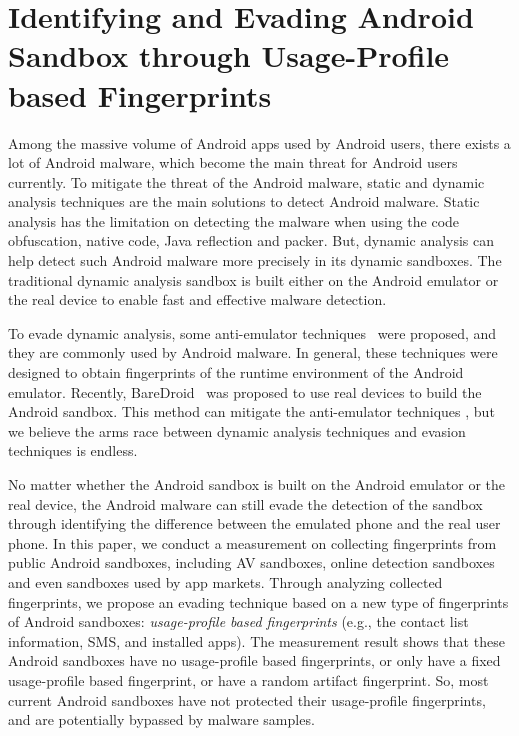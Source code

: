 \chapter{Identifying and Evading Android Sandbox through Usage-Profile based Fingerprints}


Among the massive volume of Android apps used by Android users, there exists a lot of Android malware, which become the main threat for Android users currently. To mitigate the threat of the Android malware, static and dynamic analysis techniques are the main solutions to detect Android malware. Static analysis has the limitation on detecting the malware when using the code obfuscation, native code, Java reflection and packer. But, dynamic analysis can help detect such Android malware more precisely in its dynamic sandboxes. The traditional dynamic analysis sandbox is built either on the Android emulator or the real device to enable fast and effective malware detection. 

To evade dynamic analysis, some anti-emulator techniques~\cite{Petsas,Vidas,Jing} were proposed, and they are commonly used by Android malware. In general, these techniques were designed to obtain fingerprints of the runtime environment of the Android emulator. Recently, BareDroid~\cite{Mutti:2015:BLA:2818000.2818036} was proposed to use real devices to build the Android sandbox. This method can mitigate the anti-emulator techniques
, but we believe the arms race between dynamic analysis techniques and evasion techniques is endless.

No matter whether the Android sandbox is built on the Android emulator or the real device, the Android malware can still evade the detection of the sandbox through identifying the difference between the emulated phone and the real user phone. In this paper, we conduct a measurement on collecting fingerprints from public Android sandboxes, including AV sandboxes, online detection sandboxes and even sandboxes used by app markets. Through analyzing collected fingerprints, we propose an evading technique based on a new type of fingerprints of Android sandboxes: \textit{usage-profile based fingerprints} (e.g., the contact list information, SMS, and installed apps). The measurement result shows that these Android sandboxes have no usage-profile based fingerprints, or only have a fixed usage-profile based fingerprint, or have a random artifact fingerprint. So, most current Android sandboxes have not protected their usage-profile fingerprints, and are potentially bypassed by malware samples.

